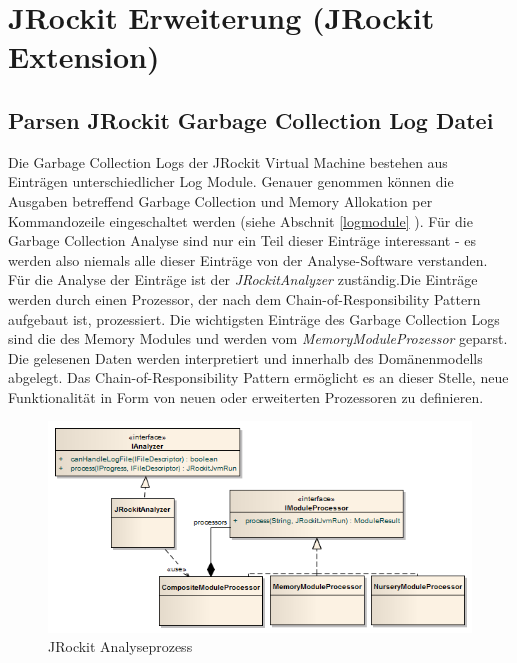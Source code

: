 \section{JRockit Erweiterung (JRockit Extension)}
\subsection{Parsen JRockit Garbage Collection Log Datei}
Die Garbage Collection Logs der JRockit Virtual Machine bestehen aus Einträgen unterschiedlicher Log Module. Genauer genommen können die Ausgaben betreffend Garbage Collection und Memory Allokation per Kommandozeile eingeschaltet werden (siehe Abschnit \ref{logmodule} ). Für die Garbage Collection Analyse sind nur ein Teil dieser Einträge interessant - es werden also niemals alle dieser Einträge von der Analyse-Software verstanden. Für die Analyse der Einträge ist der \textit{JRockitAnalyzer} zuständig.Die Einträge werden durch einen Prozessor, der nach dem Chain-of-Responsibility Pattern\cite{wiki:chainOfResponsibilityPattern} aufgebaut ist, prozessiert. Die wichtigsten Einträge des Garbage Collection Logs sind die des Memory Modules und werden vom 
\textit{MemoryModuleProzessor} geparst. Die gelesenen Daten werden interpretiert und innerhalb des Domänenmodells abgelegt. Das Chain-of-Responsibility Pattern ermöglicht es an dieser Stelle, neue Funktionalität in Form von neuen oder erweiterten Prozessoren zu definieren.

 \begin{figure}[H]
  	\centering
        	\caption{JRockit Analyseprozess}
    	\includegraphics[width=16cm]{images/jrockit_log_processing}
\end{figure}

